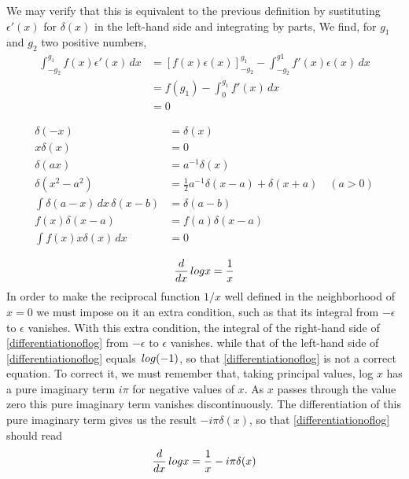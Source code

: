 We may verify that this is equivalent to the previous definition by sustituting $\epsilon'(x)$ for $\delta(x)$ in the left-hand side and integrating by parts, We find, for $g_1$ and $g_2$ two positive numbers,
\begin{align*}
\int_{-g_2}^{g_1} f(x) \epsilon'(x) \, dx & = [f(x)\epsilon(x)]^{g_1}_{-g_2}-\int^{g1}_{-g_2} f'(x) \epsilon(x) \, dx \\
& = f(g_1) - \int^{g_1}_0 f'(x) \, dx \\
& = 0
\end{align*}

\begin{align}
\delta(-x) & = \delta(x) \\
x\delta(x) & = 0 \\
\delta(a x) & = a^{-1} \delta(x)\\
\delta(x^2-a^2) & = \frac{1}{2} a^{-1} {\delta(x-a)+\delta(x+a)} \quad (a>0)\\
\int \delta(a-x) \, dx \, \delta(x-b) & = \delta(a-b) \\
f(x) \delta(x-a) &=  f(a)\delta(x-a)\\
\int f(x)x\delta(x) \, dx & = 0
\end{align}

\begin{equation}
\frac{d}{dx} \mathrm \,{log} x = \frac{1}{x}
\label{differentiationoflog}
\end{equation}
In order to make the reciprocal function $1/x$ well defined in the neighborhood of $x=0$ we must impose on it an extra condition, such as that its integral from $- \epsilon$ to $\epsilon$ vanishes. With this extra condition, the integral of the right-hand side of \ref{differentiationoflog} from $-\epsilon$ to $\epsilon$ vanishes. while that of the left-hand side of \ref{differentiationoflog} equals $\mathrm \,{log}(-1)$, so that \ref{differentiationoflog} is not a correct equation. To correct it, we must remember that, taking principal values, log $x$ has a pure imaginary term $i\pi$ for negative values of $x$. As $x$ passes through the value zero this pure imaginary term vanishes discontinuously. The differentiation of this pure imaginary term gives us the result $-i\pi\delta(x)$, so that \ref{differentiationoflog} should read 
\begin{equation}
\frac{d}{dx}\mathrm \,{log} x =\frac{1}{x} - i \pi \delta (x)
\end{equation}

